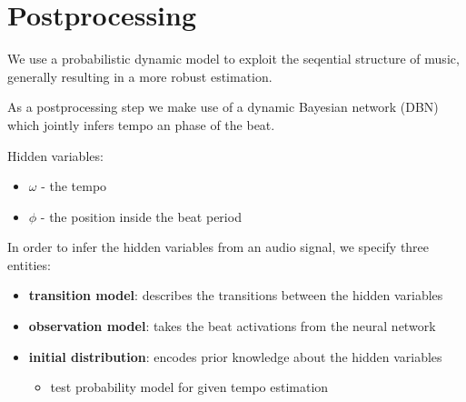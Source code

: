 \documentclass{article}
\begin{document}
\section{Postprocessing}

We use a probabilistic dynamic model to exploit the seqential structure of music, generally resulting in a more robust estimation.

As a postprocessing step we make use of a dynamic Bayesian network (DBN) which jointly infers tempo an phase of the beat.

\vspace{1em}
Hidden variables: 
\begin{itemize}
\item $\omega$ - the tempo
\item $\phi$ - the position inside the beat period
\end{itemize}

\vspace{1em}
In order to infer the hidden variables from an audio signal, we specify three entities:

\begin{itemize}
\item \textbf{transition model}: describes the transitions between the hidden variables 
\item \textbf{observation model}: takes the beat activations from the neural network
\item \textbf{initial distribution}: encodes prior knowledge about the hidden variables
\begin{itemize}
\item test probability model for given tempo estimation 
\end{itemize}
\end{itemize}
\end{document}
